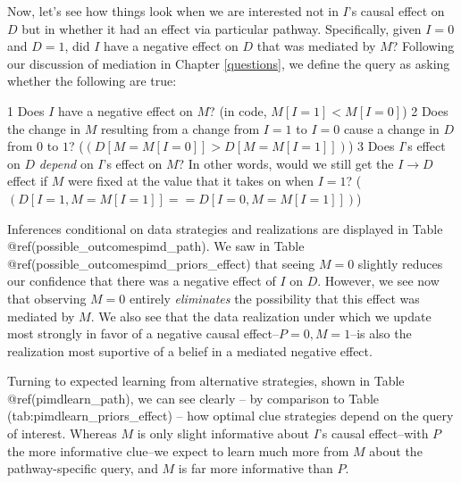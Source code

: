 \documentclass[
  12pt,
]{book}
\begin{document}
Now, let's see how things look when we are interested not in \(I\)'s causal effect on \(D\) but in whether it had an effect via particular pathway. Specifically, given \(I=0\) and \(D=1\), did \(I\) have a negative effect on \(D\) that was mediated by \(M\)? Following our discussion of mediation in Chapter \ref{questions}, we define the query as asking whether the following are true:

1 Does \(I\) have a negative effect on \(M\)? (in code, \(M[I=1] < M[I=0]\))
2 Does the change in \(M\) resulting from a change from \(I=1\) to \(I=0\) cause a change in \(D\) from \(0\) to \(1\)? (\((D[M=M[I=0]] > D[M=M[I=1]])\))
3 Does \(I\)'s effect on \(D\) \emph{depend} on \(I\)'s effect on \(M\)? In other words, would we still get the \(I \rightarrow D\) effect if \(M\) were fixed at the value that it takes on when \(I=1\)? (\((D[I=1, M=M[I=1]] == D[I=0, M=M[I=1]])\))

Inferences conditional on data strategies and realizations are displayed in Table @ref(possible\_outcomespimd\_path). We saw in Table @ref(possible\_outcomespimd\_priors\_effect) that seeing \(M=0\) slightly reduces our confidence that there was a negative effect of \(I\) on \(D\). However, we see now that observing \(M=0\) entirely \emph{eliminates} the possibility that this effect was mediated by \(M\). We also see that the data realization under which we update most strongly in favor of a negative causal effect--\(P=0, M=1\)--is also the realization most suportive of a belief in a mediated negative effect.

Turning to expected learning from alternative strategies, shown in Table @ref(pimdlearn\_path), we can see clearly -- by comparison to Table (tab:pimdlearn\_priors\_effect) -- how optimal clue strategies depend on the query of interest. Whereas \(M\) is only slight informative about \(I\)'s causal effect--with \(P\) the more informative clue--we expect to learn much more from \(M\) about the pathway-specific query, and \(M\) is far more informative than \(P\).
\end{document}
